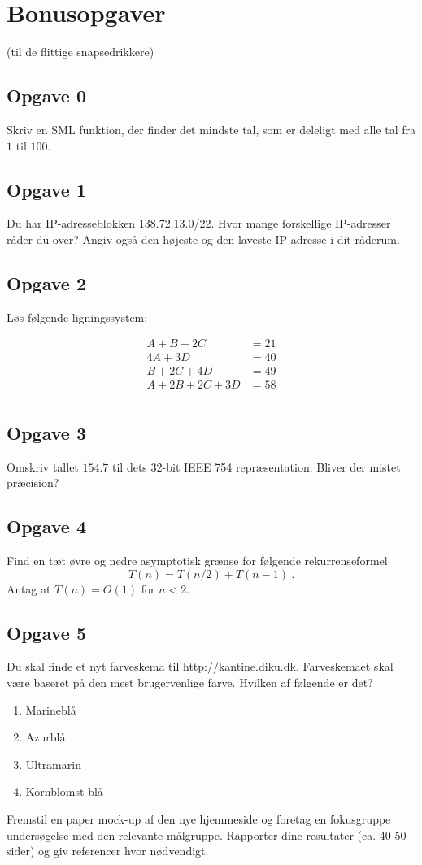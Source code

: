 \section{\huge{Bonusopgaver}}
(til de flittige snapsedrikkere)


\subsection{Opgave 0}
Skriv en SML funktion, der finder det mindste tal, som er deleligt med alle
tal fra $1$ til $100$.


\subsection{Opgave 1}
Du har IP-adresseblokken 138.72.13.0/22. Hvor mange forskellige IP-adresser
råder du over? Angiv også den højeste og den laveste IP-adresse i dit råderum.


\subsection{Opgave 2}
Løs følgende ligningssystem:

\begin{align*}
A + B + 2C &= 21 \\
4A + 3D &= 40 \\
B + 2C + 4D &= 49 \\
A + 2B + 2C + 3D &= 58 \\
\end{align*}


\subsection{Opgave 3}
Omskriv tallet $154.7$ til dets 32-bit IEEE 754 repræsentation. Bliver der
mistet præcision?

\subsection{Opgave 4}

Find en tæt øvre og nedre asymptotisk grænse for følgende rekurrenseformel
\[
    T(n) = T(n/2) + T(n-1)\ .
\]
Antag at $T(n) = O(1)$ for $n < 2$.


\subsection{Opgave 5}
Du skal finde et nyt farveskema til \url{http://kantine.diku.dk}. Farveskemaet
skal være baseret på den mest brugervenlige farve. Hvilken af følgende er det?
\begin{enumerate}
    \item Marineblå
    \item Azurblå
    \item Ultramarin
    \item Kornblomst blå
\end{enumerate}
Fremstil en paper mock-up af den nye hjemmeside og foretag en fokusgruppe
undersøgelse med den relevante målgruppe. Rapporter dine resultater (ca.
40-50 sider) og giv referencer hvor nødvendigt.



